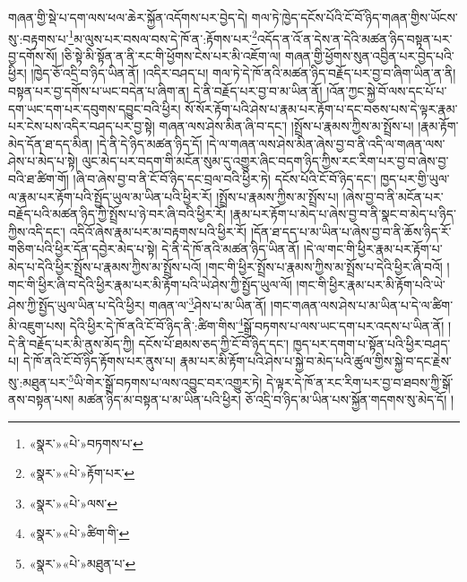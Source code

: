 གཞན་གྱི་སྡེ་པ་དག་ལས་ཕལ་ཆེར་སྐྱོན་འདོགས་པར་བྱེད་དེ། གལ་ཏེ་ཁྱེད་དངོས་པོའི་ངོ་བོ་ཉིད་གཞན་གྱིས་ཡོངས་སུ་:བརྟགས་པ་\footnote{«སྣར་»«པེ་»བཏགས་པ་}མ་ལུས་པར་བསལ་བས་དེ་ཁོ་ན་:རྟོགས་པར་\footnote{«སྣར་»«པེ་»རྟོག་པར་}འདོད་ན་འོ་ན་དེས་ན་དེའི་མཚན་ཉིད་བསྟན་པར་བྱ་དགོས་སོ། །ཅི་སྟེ་མི་སྟོན་ན་ནི་རང་གི་ཕྱོགས་ངེས་པར་མི་འཇོག་ལ། གཞན་གྱི་ཕྱོགས་སུན་འབྱིན་པར་བྱེད་པའི་ཕྱིར། །ཁྱེད་ཅོ་འདྲི་བ་ཉིད་ཡིན་ནོ། །འདིར་བཤད་པ། གལ་ཏེ་དེ་ཁོ་ནའི་མཚན་ཉིད་བརྗོད་པར་བྱ་བ་ཞིག་ཡིན་ན་ནི། བསྟན་པར་བྱ་དགོས་པ་ཡང་བདེན་པ་ཞིག་ན། དེ་ནི་བརྗོད་པར་བྱ་བ་མ་ཡིན་ནོ། །འོན་ཀྱང་སྐྱེ་བོ་ལས་དང་པོ་པ་དག་ཡང་དག་པར་དབུགས་དབྱུང་བའི་ཕྱིར། སོ་སོར་རྟོག་པའི་ཤེས་པ་རྣམ་པར་རྟོག་པ་དང་བཅས་པས་དེ་ལྟར་རྣམ་པར་ངེས་པས་འདིར་བཤད་པར་བྱ་སྟེ། གཞན་ལས་ཤེས་མིན་ཞི་བ་དང་། །སྤྲོས་པ་རྣམས་ཀྱིས་མ་སྤྲོས་པ། །རྣམ་རྟོག་མེད་དོན་ཐ་དད་མིན། །དེ་ནི་དེ་ཉིད་མཚན་ཉིད་དོ། །དེ་ལ་གཞན་ལས་ཤེས་མིན་ཞེས་བྱ་བ་ནི་འདི་ལ་གཞན་ལས་ཤེས་པ་མེད་པ་སྟེ། ལུང་མེད་པར་བདག་གི་མངོན་སུམ་དུ་འགྱུར་ཞིང་བདག་ཉིད་ཀྱིས་རང་རིག་པར་བྱ་བ་ཞེས་བྱ་བའི་ཐ་ཚིག་གོ། །ཞི་བ་ཞེས་བྱ་བ་ནི་ངོ་བོ་ཉིད་དང་བྲལ་བའི་ཕྱིར་ཏེ། དངོས་པོའི་ངོ་བོ་ཉིད་དང་། ཁྱད་པར་གྱི་ཡུལ་ལ་རྣམ་པར་རྟོག་པའི་སྤྱོད་ཡུལ་མ་ཡིན་པའི་ཕྱིར་རོ། །སྤྲོས་པ་རྣམས་ཀྱིས་མ་སྤྲོས་པ། །ཞེས་བྱ་བ་ནི་མངོན་པར་བརྗོད་པའི་མཚན་ཉིད་ཀྱི་སྤྲོས་པ་ཉེ་བར་ཞི་བའི་ཕྱིར་རོ། །རྣམ་པར་རྟོག་པ་མེད་པ་ཞེས་བྱ་བ་ནི་སྣང་བ་མེད་པ་ཉིད་ཀྱིས་འདི་དང་། འདིའོ་ཞེས་རྣམ་པར་མ་བརྟགས་པའི་ཕྱིར་རོ། །དོན་ཐ་དད་པ་མ་ཡིན་པ་ཞེས་བྱ་བ་ནི་ཆོས་ཉིད་རོ་གཅིག་པའི་ཕྱིར་དོན་དབྱེར་མེད་པ་སྟེ། དེ་ནི་དེ་ཁོ་ནའི་མཚན་ཉིད་ཡིན་ནོ། །དེ་ལ་གང་གི་ཕྱིར་རྣམ་པར་རྟོག་པ་མེད་པ་དེའི་ཕྱིར་སྤྲོས་པ་རྣམས་ཀྱིས་མ་སྤྲོས་པའོ། །གང་གི་ཕྱིར་སྤྲོས་པ་རྣམས་ཀྱིས་མ་སྤྲོས་པ་དེའི་ཕྱིར་ཞི་བའོ། །གང་གི་ཕྱིར་ཞི་བ་དེའི་ཕྱིར་རྣམ་པར་མི་རྟོག་པའི་ཡེ་ཤེས་ཀྱི་སྤྱོད་ཡུལ་ལོ། །གང་གི་ཕྱིར་རྣམ་པར་མི་རྟོག་པའི་ཡེ་ཤེས་ཀྱི་སྤྱོད་ཡུལ་ཡིན་པ་དེའི་ཕྱིར། གཞན་ལ་\footnote{«སྣར་»«པེ་»ལས་}ཤེས་པ་མ་ཡིན་ནོ། །གང་གཞན་ལས་ཤེས་པ་མ་ཡིན་པ་དེ་ལ་ཚིག་མི་འཇུག་པས། དེའི་ཕྱིར་དེ་ཁོ་ནའི་ངོ་བོ་ཉིད་ནི་:ཚིག་གིས་\footnote{«སྣར་»«པེ་»ཚིག་གི་}སྒྲོ་བཏགས་པ་ལས་ཡང་དག་པར་འདས་པ་ཡིན་ནོ། །དེ་ནི་བརྗོད་པར་མི་ནུས་མོད་ཀྱི། དངོས་པོ་ཐམས་ཅད་ཀྱི་ངོ་བོ་ཉིད་དང་། ཁྱད་པར་དགག་པ་སྟོན་པའི་ཕྱིར་བཤད་པ། དེ་ཁོ་ནའི་ངོ་བོ་ཉིད་རྟོགས་པར་ནུས་པ། རྣམ་པར་མི་རྟོག་པའི་ཤེས་པ་སྐྱེ་བ་མེད་པའི་ཚུལ་གྱིས་སྐྱེ་བ་དང་རྗེས་སུ་:མཐུན་པར་\footnote{«སྣར་»«པེ་»མཐུན་པ་}ཡི་གེར་སྒྲོ་བཏགས་པ་ལས་འབྱུང་བར་འགྱུར་ཏེ། དེ་ལྟར་དེ་ཁོ་ན་རང་རིག་པར་བྱ་བ་ཐབས་ཀྱི་སྒོ་ནས་བསྟན་པས། མཚན་ཉིད་མ་བསྟན་པ་མ་ཡིན་པའི་ཕྱིར། ཅོ་འདྲི་བ་ཉིད་མ་ཡིན་པས་སྐྱོན་གདགས་སུ་མེད་དོ། །
